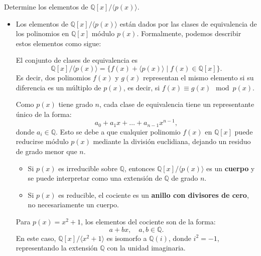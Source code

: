 Determine los elementos de \( \mathbb{Q}[x] / \langle p(x) \rangle \).

\begin{itemize}
    \item Los elementos de $\mathbb{Q}[x] / \langle p(x) \rangle$ están dados por las clases de equivalencia de los polinomios en $\mathbb{Q}[x]$ módulo $p(x)$. Formalmente, podemos describir estos elementos como sigue:
    
    El conjunto de clases de equivalencia es
    \[
    \mathbb{Q}[x] / \langle p(x) \rangle = \{ f(x) + \langle p(x) \rangle \mid f(x) \in \mathbb{Q}[x] \}.
    \]
    Es decir, dos polinomios $f(x)$ y $g(x)$ representan el mismo elemento si su diferencia es un múltiplo de $p(x)$, es decir, si $f(x) \equiv g(x) \mod p(x)$.
    
    Como $p(x)$ tiene grado $n$, cada clase de equivalencia tiene un representante único de la forma:
    \[
     a_0 + a_1 x + \dots + a_{n-1} x^{n-1},
    \]
    donde $a_i \in \mathbb{Q}$. Esto se debe a que cualquier polinomio $f(x)$ en $\mathbb{Q}[x]$ puede reducirse módulo $p(x)$ mediante la división euclidiana, dejando un residuo de grado menor que $n$.
    
    \begin{itemize}
        \item Si $p(x)$ es irreducible sobre $\mathbb{Q}$, entonces $\mathbb{Q}[x] / \langle p(x) \rangle$ es un \textbf{cuerpo} y se puede interpretar como una extensión de $\mathbb{Q}$ de grado $n$.
        \item Si $p(x)$ es reducible, el cociente es un \textbf{anillo con divisores de cero}, no necesariamente un cuerpo.
    \end{itemize}
    
    Para $p(x) = x^2 + 1$, los elementos del cociente son de la forma:
    \[
     a + bx, \quad a, b \in \mathbb{Q}.
    \]
    En este caso, $\mathbb{Q}[x] / \langle x^2 + 1 \rangle$ es isomorfo a $\mathbb{Q}(i)$, donde $i^2 = -1$, representando la extensión $\mathbb{Q}$ con la unidad imaginaria.
\end{itemize}